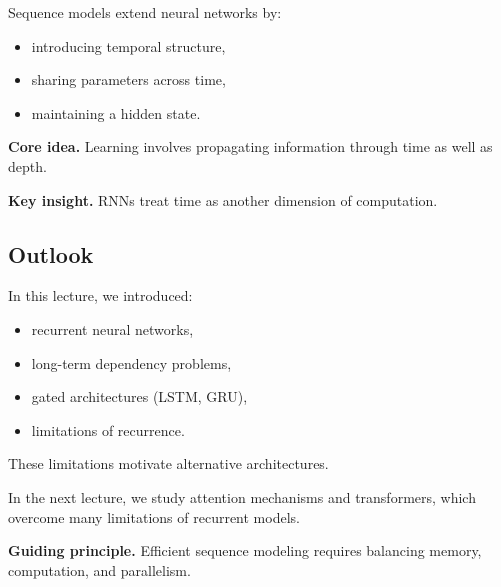 Sequence models extend neural networks by:

\begin{itemize}
    \item introducing temporal structure,
    \item sharing parameters across time,
    \item maintaining a hidden state.
\end{itemize}

\medskip

\noindent
\textbf{Core idea.}  
Learning involves propagating information through time as well as depth.

\medskip

\noindent
\textbf{Key insight.}  
RNNs treat time as another dimension of computation.

\subsection{Outlook}

In this lecture, we introduced:

\begin{itemize}
    \item recurrent neural networks,
    \item long-term dependency problems,
    \item gated architectures (LSTM, GRU),
    \item limitations of recurrence.
\end{itemize}

\medskip

\noindent
These limitations motivate alternative architectures.

\medskip

\noindent
In the next lecture, we study attention mechanisms and transformers, which overcome many limitations of recurrent models.

\medskip

\noindent
\textbf{Guiding principle.}  
Efficient sequence modeling requires balancing memory, computation, and parallelism.